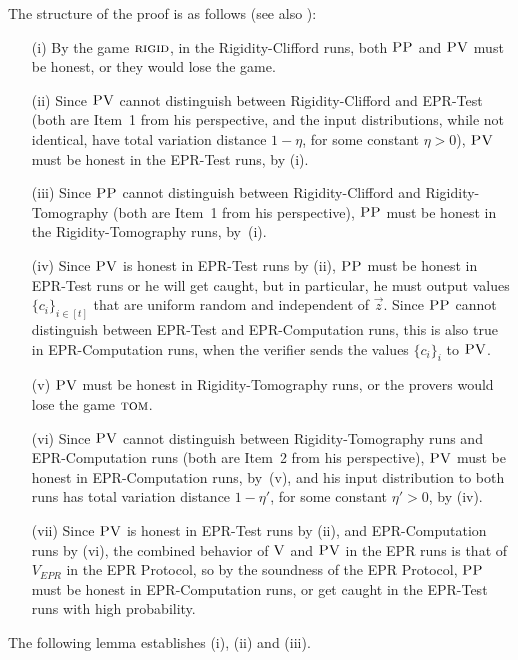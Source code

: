\documentclass{toc}
\newcommand{\rigid}{\textsc{rigid}}
\newcommand{\tom}{\textsc{tom}}
\newcommand{\ver}{\textsc{V}}
\newcommand{\pv}{\textsc{PV}}
\newcommand{\pp}{\textsc{PP}}
\begin{document}
\noindent The structure of the proof is as follows (see also ):
\begin{enumerate}
\item[(i)] By the game $\rigid$, in the Rigidity-Clifford runs, both $\pp$ and $\pv$ must be honest, or they would lose the game.
\item[(ii)] Since $\pv$ cannot distinguish between Rigidity-Clifford and EPR-Test (both are  Item~1 from his perspective, and the input distributions, while not identical, have total variation distance $1 - \eta$, for some constant $\eta > 0$), $\pv$ must be honest in the EPR-Test runs, by (i). 
\item[(iii)] Since $\pp$ cannot distinguish between Rigidity-Clifford and Rigidity-Tomography (both are  Item~1 from his perspective), $\pp$ must be honest in the Rigidity-Tomography runs, by~(i). 
\item[(iv)] Since $\pv$ is honest in EPR-Test runs by (ii), $\pp$ must be honest in EPR-Test runs or he will get caught, but in particular, he must output values $\{c_i\}_{i\in [t]}$ that are uniform random and independent of $\vec{z}$. Since $\pp$ cannot distinguish between EPR-Test and EPR-Computation runs, this is also true in EPR-Computation runs, when the verifier sends the values $\{c_i\}_i$ to $\pv$. 
\item[(v)] $\pv$ must be honest in Rigidity-Tomography runs, or the provers would lose the game $\tom$.
\item[(vi)] Since $\pv$ cannot distinguish between Rigidity-Tomography runs and EPR-Computation runs (both are  Item~2 from his perspective), $\pv$ must be honest in EPR-Computation runs, by~(v), and his input distribution to both runs has total variation distance $1 - \eta'$, for some constant $\eta' > 0$, by (iv).
\item[(vii)] Since $\pv$ is honest in EPR-Test runs by (ii), and EPR-Computation runs by (vi), the combined behavior of $\ver$ and $\pv$ in the EPR runs is that of $V_{EPR}$ in the EPR Protocol, so
by the soundness of the EPR Protocol, $\pp$ must be honest in EPR-Computation runs, or get caught in the EPR-Test runs with high probability.
\end{enumerate}

 The following lemma establishes (i), (ii) and (iii). 
\end{document}

